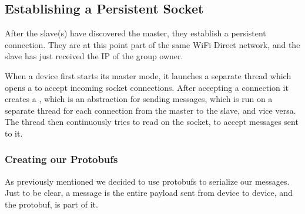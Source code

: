 \subsection{Establishing a Persistent Socket}

After the slave(s) have discovered the master, they establish a persistent connection.
They are at this point part of the same WiFi Direct network, and the slave has just received the IP of the group owner.

When a device first starts its master mode, it launches a separate thread which opens a  to accept incoming socket connections.
After accepting a connection it creates a , which is an abstraction for sending messages, which is run on a separate thread for each connection from the master to the slave, and vice versa.
The thread then continuously tries to read on the socket, to accept messages sent to it.

\subsubsection*{Creating our Protobufs}
As previously mentioned we decided to use protobufs to serialize our messages.
Just to be clear, a message is the entire payload sent from device to device, and the protobuf, is part of it.


